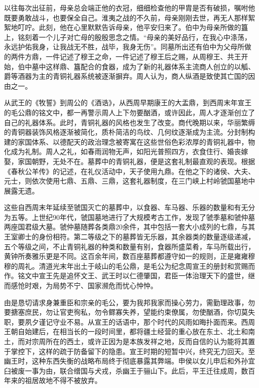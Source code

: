 以往每次出征前，母亲总会端正他的衣冠，细细检查他的甲胄是否有破损，嘱咐他既要勇敢战斗，也要保全自己。淮夷之战的不久前，母亲刚刚去世，再无人那样絮絮地叮咛。此刻，他在心里默默告诉母亲，他平安归来了。伯中为母亲所做的簋上，铭刻着一个儿子对亡母的殷殷思念之情。“母亲的美好品行，在我心中涤荡，永远护佑我身，让我战无不胜，战毕，我身无伤”。同墓所出还有伯中为父母所做的两件方鼎，一件记述了穆王之命，一件记述了穆王后之赐，从周穆王、共王开始，伯中墓中这样鼎、簋配合的食器，成为了新的礼器体系主流商人创立的以觚、爵等酒器为主的青铜礼器系统被逐渐摒弃。周人认为，商人纵酒是致使其亡国的因由之一。

从武王的《牧誓》到周公的《酒诰》，从西周早期康王的大盂鼎，到西周末年宣王的毛公鼎的铭文中，都一再警示周人上下勿要酗酒，或许因此，周人才逐渐创立了自己的礼器体系。此时，青铜礼器的风格也发生了改变。商代晚期以来，华丽繁缛的青铜器装饰风格逐渐被简化，质朴简洁的鸟纹、几何纹逐渐成为主流。分封制构建的家国体系、以德配天的政治理念被寄寓在这些世俗色彩浓厚的青铜礼器中，物化成为礼制。周人之礼，如春雨润物无声，如阳光普照四方，衣食住行、婚丧嫁娶，家国朝野，无处不在。墓葬中的青铜礼器，便是这套礼制最直观的表现。根据《春秋公羊传》的记述，在礼仪活动中，天子使用九鼎。在他之下的诸侯、大夫、元士，则依次使用七鼎、五鼎、三鼎，这套礼器制度，在三门峡上村岭虢国墓地中展露无遗。

这些自西周末年延续至虢国灭亡的墓葬中，以食器、车马器、乐器的数量和有无分为五等。上世纪90年代，虢国墓地进行了大规模考古工作，发现了虢季墓和虢仲墓两座国君级大墓。虢仲墓随葬各类鼎20余件，其中包括一套大小成列的七鼎，与其王室卿士的身份相符。第二等级之下的墓葬皆无乐器，其余器类的数量逐级递减，五个等级之间，不止青铜礼器的种类和数量有别，食器所盛菜肴，车马所载出行，黄钟所奏雅乐更是不同。这百余年间，数百座墓葬都遵守如一的规则，正是雍雍穆穆的周礼。清道光末年出土于岐山的毛公鼎，是毛公为纪念周宣王的册封和赏赐而作。铭文中宣王先是追怀文王、武王时以仁德肇国，君臣一体治理天下的盛世，继而感怆时艰，为局势不宁、国家濒危而忧心忡忡。

由是恳切请求身兼重臣和宗亲的毛公，要为我邦我家而操心劳力，需勤理政事，勿要搪塞庶民，勿让官吏徇私，勿令鳏寡失养，望能约束僚属，勿使酗酒，你切莫失职，要夙夕谨记守业不易。从宣王的话语中，那个时代的风雨如晦扑面而来。西周王朝自始建后，在相当长的一段时间里，都将疆土经营的重心放在东土、北土和南土，而对宗周所在的西土，或许正因为是本族发祥之地，反而自信的认为能将其置于掌控下，这样的疏于防备留下的隐患。宣王时期的短暂中兴，终究无力回天。至幽王时，这种东西失衡的战略布局终于彻底暴露其弊端。申侯以女儿申后和外孙宜臼被废一事为由，联合缯国与犬戎，杀幽王于骊山下。此后，平王迁往成周，数百年来的祖居故地不得不被放弃。

